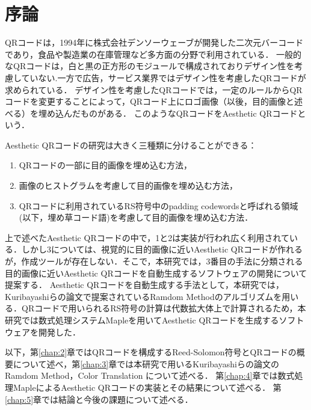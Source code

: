 \documentclass{thesis}
\begin{document}
\tableofcontents

\chapter{序論}

QRコード\cite{QR}は，1994年に株式会社デンソーウェーブが開発した二次元バーコード であり，食品や製造業の在庫管理など多方面の分野で利用されている．
一般的なQRコードは，白と黒の正方形のモジュールで構成されておりデザイン性を考慮していない.一方で広告，サービス業界ではデザイン性を考慮したQRコードが求められている．
デザイン性を考慮したQRコードでは，一定のルールからQRコードを変更することによって，QRコード上にロゴ画像（以後，目的画像と述べる）を埋め込んだものがある．
このようなQRコードをAesthetic QRコード\cite{KURI}という．

Aesthetic QRコードの研究は大きく三種類に分けることができる：

\begin{enumerate}
\item
QRコードの一部に目的画像を埋め込む方法\cite{frame}，
\item
画像のヒストグラムを考慮して目的画像を埋め込む方法\cite{hist}，
\item
QRコードに利用されているRS符号中のpadding codewordsと呼ばれる領域(以下，埋め草コード語)を考慮して目的画像を埋め込む方法\cite{KURI}．
\end{enumerate}

上で述べたAesthetic QRコードの中で，1と2は実装が行われ広く利用されている．しかし3については、視覚的に目的画像に近いAesthetic QRコードが作れるが，作成ツールが存在しない．そこで，本研究では，3番目の手法に分類される目的画像に近いAesthetic QRコードを自動生成するソフトウェアの開発について提案する．
Aesthetic QRコードを自動生成する手法として，本研究では，Kuribayashiらの論文\cite{KURI}で提案されているRamdom Methodのアルゴリズムを用いる．QRコードで用いられるRS符号の計算は代数拡大体上で計算されるため，本研究では数式処理システムMapleを用いてAesthetic QRコードを生成するソフトウェアを開発した．

以下，第\ref{chap:2}章ではQRコードを構成するReed-Solomon符号とQRコードの概要について述べ，第\ref{chap:3}章では本研究で用いるKuribayashiらの論文\cite{KURI}のRamdom Method，Color Translation
について述べる．
第\ref{chap:4}章では数式処理MapleによるAesthetic QRコードの実装とその結果について述べる．
第\ref{chap:5}章では結論と今後の課題について述べる．
\end{document}
